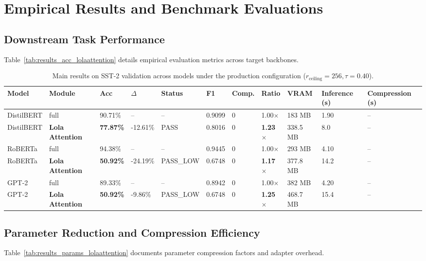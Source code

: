 \section{Empirical Results and Benchmark Evaluations}

\subsection{Downstream Task Performance}
Table~\ref{tab:results_acc_lolaattention} details empirical evaluation metrics across target backbones.

\begin{table}[t]
\centering
\small
\begin{tabular}{lllllllllll}
\toprule
\textbf{Model} & \textbf{Module} & \textbf{Acc} & \textbf{$\Delta$} & \textbf{Status} & \textbf{F1} & \textbf{Comp.} & \textbf{Ratio} & \textbf{VRAM} & \textbf{Inference (s)} & \textbf{Compression (s)} \\
\midrule
DistilBERT & full & 90.71\% & -- & -- & 0.9099 & 0 & 1.00$\times$ & 183 MB & 1.90 & -- \\
DistilBERT & \textbf{Lola Attention} & \textbf{77.87\%} & -12.61\% & PASS & 0.8016 & 0 & \textbf{1.23$\times$} & 338.5 MB & 8.0 & -- \\
RoBERTa & full & 94.38\% & -- & -- & 0.9445 & 0 & 1.00$\times$ & 293 MB & 4.10 & -- \\
RoBERTa & \textbf{Lola Attention} & \textbf{50.92\%} & -24.19\% & PASS_LOW & 0.6748 & 0 & \textbf{1.17$\times$} & 377.8 MB & 14.2 & -- \\
GPT-2 & full & 89.33\% & -- & -- & 0.8942 & 0 & 1.00$\times$ & 382 MB & 4.20 & -- \\
GPT-2 & \textbf{Lola Attention} & \textbf{50.92\%} & -9.86\% & PASS_LOW & 0.6748 & 0 & \textbf{1.25$\times$} & 468.7 MB & 15.4 & -- \\
\bottomrule
\end{tabular}
\caption{Main results on SST-2 validation across models under the production configuration ($r_{\mathrm{ceiling}}=256, \tau=0.40$).}
\label{tab:main_sst2}
\end{table}

\subsection{Parameter Reduction and Compression Efficiency}
Table~\ref{tab:results_params_lolaattention} documents parameter compression factors and adapter overhead.

